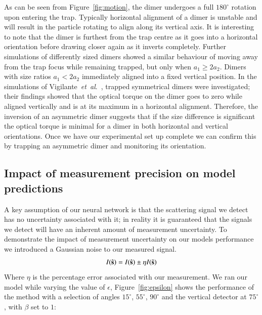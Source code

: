 \documentclass[final,  3p]{elsarticle}
\begin{document}
As can be seen from Figure~\ref{fig:motion}, the dimer undergoes a full $180^{\circ}$ rotation upon entering the trap.  Typically horizontal alignment of a dimer is unstable and will result in the particle rotating to align along its vertical axis.  It is interesting to note that the dimer is furthest from the trap centre as it goes into a horizontal orientation before drawing closer again as it inverts completely. Further simulations of differently sized dimers showed a similar behaviour of moving away from the trap focus while remaining trapped, but only when $a_1 \geq 2a_2$.  Dimers with size ratios $a_1 < 2a_2$ immediately aligned into a fixed vertical position.
%
In the simulations of Vigilante~\emph{et~al}.\ \cite{Vigilante2020Brownian_OT}, trapped symmetrical dimers were investigated; their findings showed that the optical torque on the dimer goes to zero while aligned vertically and is at its maximum in a horizontal alignment. Therefore, the inversion of an asymmetric dimer suggests that if the size difference is significant the optical torque is minimal for a dimer in both horizontal and vertical orientations. Once we have our experimental set up complete we can confirm this by trapping an asymmetric dimer and monitoring its orientation. 
\subsection{Impact of measurement precision on model predictions}
\label{sec:epsilon}

A key assumption of our neural network is that the scattering signal we detect has no uncertainty associated with it; in reality it is guaranteed that the signals we detect will have an inherent amount of measurement uncertainty. To demonstrate the impact of measurement uncertainty on our models performance we introduced a Gaussian noise to our measured signal.
\begin{align}
	I(\hat{\bf s}) = I(\hat{\bf s}) \pm \eta I(\hat{\bf s})
\end{align}
Where $\eta$ is the percentage error associated with our measurement. We ran our model while varying the value of $\epsilon$, Figure~\ref{fig:epsilon} shows the performance of the method with a selection of angles $15^{\circ}$, $55^{\circ}$, $90^{\circ}$ and the vertical detector at $75^{\circ}$, with $\beta$ set to $1$:
\end{document}
